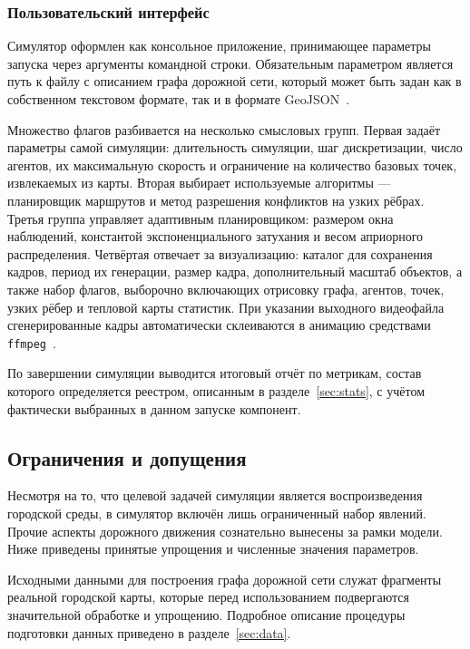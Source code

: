\subsubsection{Пользовательский интерфейс}

Симулятор оформлен как консольное приложение, принимающее параметры запуска через аргументы командной 
строки. Обязательным параметром является путь к файлу с описанием графа дорожной сети, который может 
быть задан как в собственном текстовом формате, так и в формате GeoJSON~\cite{geojson}.

Множество флагов разбивается на несколько смысловых групп. Первая задаёт параметры самой симуляции: 
длительность симуляции, шаг дискретизации, число агентов, их максимальную скорость и ограничение на 
количество базовых точек, извлекаемых из карты. Вторая выбирает используемые алгоритмы --- планировщик 
маршрутов и метод разрешения конфликтов на узких рёбрах. Третья группа управляет адаптивным 
планировщиком: размером окна наблюдений, константой экспоненциального затухания и весом априорного 
распределения. Четвёртая отвечает за визуализацию: каталог для сохранения кадров, период их генерации, 
размер кадра, дополнительный масштаб объектов, а также набор флагов, выборочно включающих отрисовку 
графа, агентов, точек, узких рёбер и тепловой карты статистик. При указании выходного видеофайла 
сгенерированные кадры автоматически склеиваются в анимацию средствами \texttt{ffmpeg}~\cite{ffmpeg}.

По завершении симуляции выводится итоговый отчёт по
метрикам, состав которого определяется реестром, описанным в разделе~\ref{sec:stats},
с учётом фактически выбранных в данном запуске компонент.

\subsection{Ограничения и допущения}
\label{sec:limits}

Несмотря на то, что целевой задачей симуляции является воспроизведения городской среды, в симулятор
включён лишь ограниченный набор явлений. Прочие аспекты дорожного движения сознательно вынесены 
за рамки модели. Ниже приведены принятые упрощения и численные значения параметров.

Исходными данными для построения графа дорожной сети служат фрагменты реальной городской карты,
которые перед использованием подвергаются значительной обработке и упрощению. Подробное описание
процедуры подготовки данных приведено в разделе~\ref{sec:data}.


